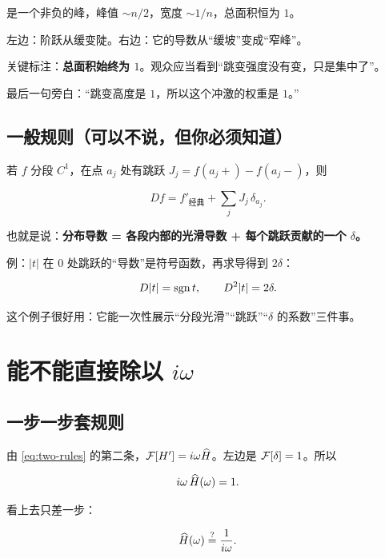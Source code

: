 是一个非负的峰，峰值 $\sim n/2$，宽度 $\sim1/n$，总面积恒为 $1$。

\begin{scriptbox}[动画要点 03-A]
左边：阶跃从缓变陡。右边：它的导数从“缓坡”变成“窄峰”。

关键标注：\textbf{总面积始终为 $1$}。观众应当看到“跳变强度没有变，只是集中了”。

最后一句旁白：“跳变高度是 $1$，所以这个冲激的权重是 $1$。”
\end{scriptbox}

\subsection{一般规则（可以不说，但你必须知道）}

若 $f$ 分段 $C^{1}$，在点 $a_j$ 处有跳跃 $J_j=f(a_j+)-f(a_j-)$，则

\begin{equation}
Df=f'_{\text{经典}}+\sum_{j}J_j\,\delta_{a_j} .\label{eq:jump}
\end{equation}

也就是说：\textbf{分布导数 = 各段内部的光滑导数 + 每个跳跃贡献的一个 $\delta$。}

例：$|t|$ 在 $0$ 处跳跃的“导数”是符号函数，再求导得到 $2\delta$：

\begin{equation}
D|t|=\operatorname{sgn} t,
\qquad
D^{2}|t|=2\delta .
\end{equation}

这个例子很好用：它能一次性展示“分段光滑”“跳跃”“$\delta$ 的系数”三件事。

\section{能不能直接除以 $i\omega$}

\subsection{一步一步套规则}

由 \eqref{eq:two-rules} 的第二条，$\mathcal{F}[H']=i\omega\widehat{H}$。左边是 $\mathcal{F}[\delta]=1$。所以

\begin{equation}
i\omega\,\widehat{H}(\omega)=1 .\label{eq:iomegaH}
\end{equation}

看上去只差一步：

\begin{equation}
\widehat{H}(\omega)\overset{?}{=}\frac{1}{i\omega}.
\end{equation}

